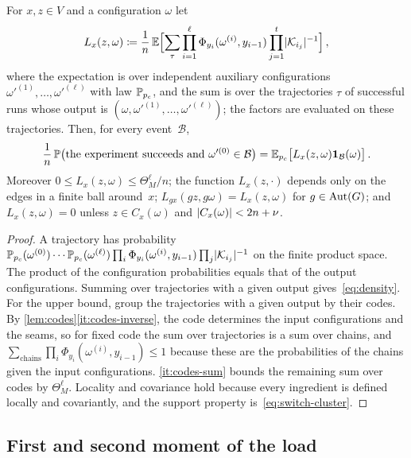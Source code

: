 \begin{lemma}\label{lem:density}
For $x,z\in V$ and a configuration $\omega$ let
\begin{equation*}
  L_x(z,\omega)\coloneqq\frac1n\,\mathbb E\Bigl[\sum_\tau\prod_{i=1}^\ell\Phi_{y_i}(\omega^{(i)},y_{i-1})
  \prod_{j=1}^t\lvert\mathcal K_{i_j}\rvert^{-1}\Bigr]\,,
\end{equation*}
where the expectation is over independent auxiliary configurations $\omega'^{(1)},\dots,\omega'^{(\ell)}$
with law $\mathbb P_{p_c}$, and the sum is over the trajectories $\tau$ of successful runs whose output is
$(\omega,\omega'^{(1)},\dots,\omega'^{(\ell)})$; the factors are evaluated on these trajectories. Then,
for every event~$\mathcal B$,
\begin{equation}\label{eq:density}
  \frac1n\,\mathbb P\bigl(\text{the experiment succeeds and }\omega'^{(0)}\in\mathcal B\bigr)
  =\mathbb E_{p_c}\bigl[L_x(z,\omega)\mathbf{1}_{\mathcal B}(\omega)\bigr]\,.
\end{equation}
Moreover $0\le L_x(z,\omega)\le\Theta_M^\ell/n$; the function $L_x(z,\cdot)$ depends only on the edges in a
finite ball around~$x$; $L_{gx}(gz,g\omega)=L_x(z,\omega)$ for $g\in\operatorname{Aut}(G)$; and $L_x(z,\omega)=0$
unless $z\in C_x(\omega)$ and $\lvert C_x(\omega)\rvert<2n+\nu$.
\end{lemma}

\begin{proof}
A trajectory has probability $\mathbb P_{p_c}(\omega^{(0)})\cdots\mathbb P_{p_c}(\omega^{(\ell)})
\prod_i\Phi_{y_i}(\omega^{(i)},y_{i-1})\prod_j\lvert\mathcal K_{i_j}\rvert^{-1}$ on the finite product space.
The product of the configuration probabilities equals that of the output configurations. Summing over
trajectories with a given output gives~\eqref{eq:density}. For the upper bound, group the trajectories
with a given output by their codes. By \cref{lem:codes}\ref{it:codes-inverse}, the code determines the
input configurations and the seams, so for fixed code the sum over trajectories is a sum over chains,
and $\sum_{\text{chains}}\prod_i\Phi_{y_i}(\omega^{(i)},y_{i-1})\le1$ because these are the
probabilities of the chains given the input configurations. \ref{it:codes-sum} bounds
the remaining sum over codes by $\Theta_M^\ell$. Locality and covariance hold because every ingredient is
defined locally and covariantly, and the support property is~\eqref{eq:switch-cluster}.
\end{proof}

\subsection{First and second moment of the load}\label{sec:load}

